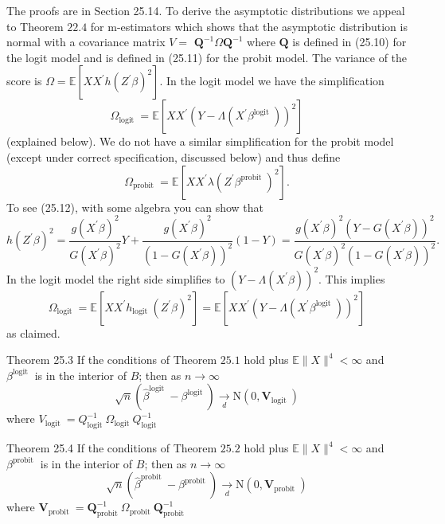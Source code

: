 \documentclass[10pt]{article}
\begin{document}
The proofs are in Section 25.14. To derive the asymptotic distributions we appeal to Theorem $22.4$ for m-estimators which shows that the asymptotic distribution is normal with a covariance matrix $V=$ $\boldsymbol{Q}^{-1} \Omega \boldsymbol{Q}^{-1}$ where $\boldsymbol{Q}$ is defined in (25.10) for the logit model and is defined in (25.11) for the probit model. The variance of the score is $\Omega=\mathbb{E}\left[X X^{\prime} h\left(Z^{\prime} \beta\right)^{2}\right]$. In the logit model we have the simplification
$$
\Omega_{\text {logit }}=\mathbb{E}\left[X X^{\prime}\left(Y-\Lambda\left(X^{\prime} \beta^{\text {logit }}\right)\right)^{2}\right]
$$
(explained below). We do not have a similar simplification for the probit model (except under correct specification, discussed below) and thus define
$$
\Omega_{\text {probit }}=\mathbb{E}\left[X X^{\prime} \lambda\left(Z^{\prime} \beta^{\text {probit }}\right)^{2}\right] .
$$
To see (25.12), with some algebra you can show that
$$
h\left(Z^{\prime} \beta\right)^{2}=\frac{g\left(X^{\prime} \beta\right)^{2}}{G\left(X^{\prime} \beta\right)^{2}} Y+\frac{g\left(X^{\prime} \beta\right)^{2}}{\left(1-G\left(X^{\prime} \beta\right)\right)^{2}}(1-Y)=\frac{g\left(X^{\prime} \beta\right)^{2}\left(Y-G\left(X^{\prime} \beta\right)\right)^{2}}{G\left(X^{\prime} \beta\right)^{2}\left(1-G\left(X^{\prime} \beta\right)\right)^{2}} .
$$
In the logit model the right side simplifies to $\left(Y-\Lambda\left(X^{\prime} \beta\right)\right)^{2}$. This implies
$$
\Omega_{\text {logit }}=\mathbb{E}\left[X X^{\prime} h_{\text {logit }}\left(Z^{\prime} \beta\right)^{2}\right]=\mathbb{E}\left[X X^{\prime}\left(Y-\Lambda\left(X^{\prime} \beta^{\text {logit }}\right)\right)^{2}\right]
$$
as claimed.

Theorem 25.3 If the conditions of Theorem $25.1$ hold plus $\mathbb{E}\|X\|^{4}<\infty$ and $\beta^{\text {logit }}$ is in the interior of $B$; then as $n \rightarrow \infty$
$$
\sqrt{n}\left(\widehat{\beta}^{\text {logit }}-\beta^{\text {logit }}\right) \underset{d}{\longrightarrow} \mathrm{N}\left(0, \boldsymbol{V}_{\text {logit }}\right)
$$
where $V_{\text {logit }}=Q_{\text {logit }}^{-1} \Omega_{\text {logit }} Q_{\text {logit }}^{-1}$

Theorem 25.4 If the conditions of Theorem $25.2$ hold plus $\mathbb{E}\|X\|^{4}<\infty$ and $\beta^{\text {probit }}$ is in the interior of $B$; then as $n \rightarrow \infty$
$$
\sqrt{n}\left(\widehat{\beta}^{\text {probit }}-\beta^{\text {probit }}\right) \underset{d}{\longrightarrow} \mathrm{N}\left(0, \boldsymbol{V}_{\text {probit }}\right)
$$
where $\boldsymbol{V}_{\text {probit }}=\boldsymbol{Q}_{\text {probit }}^{-1} \Omega_{\text {probit }} \boldsymbol{Q}_{\text {probit }}^{-1}$
\end{document}

